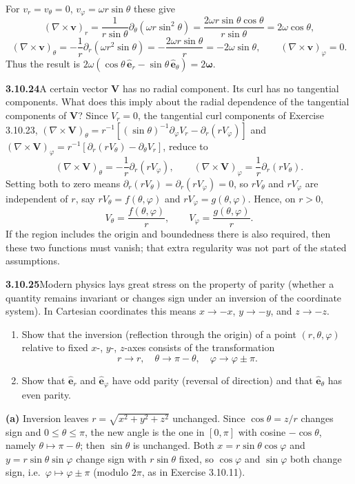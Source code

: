 For $v_r=v_\theta=0$, $v_\varphi=\omega r\sin\theta$ these give
\[
(\nabla\times\mathbf v)_r
=\frac1{r\sin\theta}\partial_\theta(\omega r\sin^2\theta)
=\frac{2\omega r\sin\theta\cos\theta}{r\sin\theta}=2\omega\cos\theta,
\]
\[
(\nabla\times\mathbf v)_\theta
=-\frac1r\partial_r(\omega r^2\sin\theta)=-\frac{2\omega r\sin\theta}{r}
=-2\omega\sin\theta,
\qquad(\nabla\times\mathbf v)_\varphi=0.
\]
Thus the result is
$2\omega(\cos\theta\,\hat{\mathbf e}_r-\sin\theta\,\hat{\mathbf e}_\theta)
=\boxed{2\boldsymbol\omega}$.

\par\bigskip
\noindent\textbf{3.10.24}\quad A certain vector $\mathbf{V}$ has no radial
component. Its curl has no tangential components. What does this imply about
the radial dependence of the tangential components of $\mathbf{V}$?
\solution
Since $V_r=0$, the tangential curl components of Exercise 3.10.23,
$(\nabla\times\mathbf V)_\theta=r^{-1}[(\sin\theta)^{-1}\partial_\varphi V_r
-\partial_r(rV_\varphi)]$ and
$(\nabla\times\mathbf V)_\varphi=r^{-1}[\partial_r(rV_\theta)-\partial_\theta V_r]$,
reduce to
\[
(\nabla\times\mathbf V)_\theta=-\frac1r\partial_r(rV_\varphi),
\qquad
(\nabla\times\mathbf V)_\varphi=\frac1r\partial_r(rV_\theta).
\]
Setting both to zero means $\partial_r(rV_\theta)=\partial_r(rV_\varphi)=0$,
so $rV_\theta$ and $rV_\varphi$ are independent of $r$,
say $rV_\theta=f(\theta,\varphi)$ and
$rV_\varphi=g(\theta,\varphi)$. Hence, on $r>0$,
\[
\boxed{V_\theta=\frac{f(\theta,\varphi)}r,\qquad
V_\varphi=\frac{g(\theta,\varphi)}r}.
\]
If the region includes the origin and boundedness there is also required,
then these two functions must vanish; that extra regularity was not
part of the stated assumptions.

\par\bigskip
\noindent\textbf{3.10.25}\quad Modern physics lays great stress on the
property of parity (whether a quantity remains invariant or changes sign under
an inversion of the coordinate system). In Cartesian coordinates this means
$x\to-x$, $y\to-y$, and $z\to-z$.
\begin{enumerate}
\item[(a)] Show that the inversion (reflection through the origin) of a point
  $(r,\theta,\varphi)$ relative to fixed $x$-, $y$-, $z$-axes consists of the
  transformation
  \[
  r\to r,\quad\theta\to\pi-\theta,\quad\varphi\to\varphi\pm\pi.
  \]
\item[(b)] Show that $\hat{\mathbf{e}}_{r}$ and $\hat{\mathbf{e}}_{\varphi}$
  have odd parity (reversal of direction) and that $\hat{\mathbf{e}}_{\theta}$
  has even parity.
\end{enumerate}
\solution
\textbf{(a)} Inversion leaves $r=\sqrt{x^2+y^2+z^2}$ unchanged.
Since $\cos\theta=z/r$ changes sign and $0\le\theta\le\pi$,
the new angle is the one in $[0,\pi]$ with cosine $-\cos\theta$,
namely $\theta\mapsto\pi-\theta$; then $\sin\theta$ is unchanged.
Both $x=r\sin\theta\cos\varphi$ and $y=r\sin\theta\sin\varphi$ change
sign with $r\sin\theta$ fixed, so $\cos\varphi$ and $\sin\varphi$ both
change sign, i.e.\ $\varphi\mapsto\varphi\pm\pi$ (modulo $2\pi$, as in
Exercise 3.10.11).

